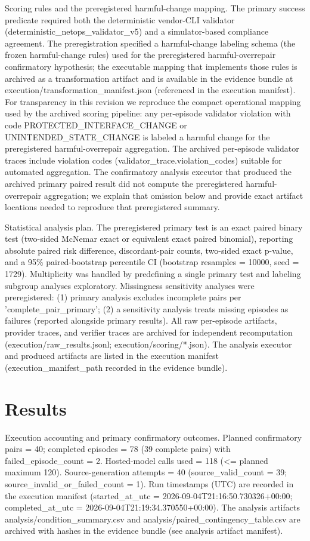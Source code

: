 \documentclass[conference]{IEEEtran}
\begin{document}
Scoring rules and the preregistered harmful-change mapping. The primary success predicate required both the deterministic vendor-CLI validator (deterministic\_netops\_validator\_v5) and a simulator-based compliance agreement. The preregistration specified a harmful-change labeling schema (the frozen harmful-change rules) used for the preregistered harmful-overrepair confirmatory hypothesis; the executable mapping that implements those rules is archived as a transformation artifact and is available in the evidence bundle at execution/transformation\_manifest.json (referenced in the execution manifest). For transparency in this revision we reproduce the compact operational mapping used by the archived scoring pipeline: any per-episode validator violation with code PROTECTED\_INTERFACE\_CHANGE or UNINTENDED\_STATE\_CHANGE is labeled a harmful change for the preregistered harmful-overrepair aggregation. The archived per-episode validator traces include violation codes (validator\_trace.violation\_codes) suitable for automated aggregation. The confirmatory analysis executor that produced the archived primary paired result did not compute the preregistered harmful-overrepair aggregation; we explain that omission below and provide exact artifact locations needed to reproduce that preregistered summary.

Statistical analysis plan. The preregistered primary test is an exact paired binary test (two-sided McNemar exact or equivalent exact paired binomial), reporting absolute paired risk difference, discordant-pair counts, two-sided exact p-value, and a 95\% paired-bootstrap percentile CI (bootstrap resamples = 10000, seed = 1729). Multiplicity was handled by predefining a single primary test and labeling subgroup analyses exploratory. Missingness sensitivity analyses were preregistered: (1) primary analysis excludes incomplete pairs per 'complete\_pair\_primary'; (2) a sensitivity analysis treats missing episodes as failures (reported alongside primary results). All raw per-episode artifacts, provider traces, and verifier traces are archived for independent recomputation (execution/raw\_results.jsonl; execution/scoring/*.json). The analysis executor and produced artifacts are listed in the execution manifest (execution\_manifest\_path recorded in the evidence bundle).

\section{Results}
Execution accounting and primary confirmatory outcomes. Planned confirmatory pairs = 40; completed episodes = 78 (39 complete pairs) with failed\_episode\_count = 2. Hosted-model calls used = 118 (<= planned maximum 120). Source-generation attempts = 40 (source\_valid\_count = 39; source\_invalid\_or\_failed\_count = 1). Run timestamps (UTC) are recorded in the execution manifest (started\_at\_utc = 2026-09-04T21:16:50.730326+00:00; completed\_at\_utc = 2026-09-04T21:19:34.370550+00:00). The analysis artifacts analysis/condition\_summary.csv and analysis/paired\_contingency\_table.csv are archived with hashes in the evidence bundle (see analysis artifact manifest).
\end{document}
